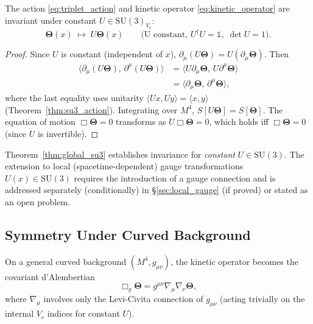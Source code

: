 \begin{theorem}
  \label{thm:global_su3}
  The action \eqref{eq:triplet_action} and kinetic operator
  \eqref{eq:kinetic_operator} are invariant under constant
  $U\in\mathrm{SU}(3)_{V_c}$:
  \begin{equation}
    \boldsymbol{\Theta}(x) \;\mapsto\; U\boldsymbol{\Theta}(x)
    \qquad\text{(U constant, } U^\dagger U = \mathbb{1},\; \det U = 1).
  \end{equation}
\end{theorem}

\begin{proof}
  Since $U$ is constant (independent of $x$), $\partial_\mu(U\boldsymbol{\Theta})
  = U(\partial_\mu\boldsymbol{\Theta})$.  Then
  \begin{align}
    \langle\partial_\mu(U\boldsymbol{\Theta}),\,\partial^\mu(U\boldsymbol{\Theta})\rangle
    &= \langle U\partial_\mu\boldsymbol{\Theta},\,U\partial^\mu\boldsymbol{\Theta}\rangle
    \nonumber\\
    &= \langle\partial_\mu\boldsymbol{\Theta},\,\partial^\mu\boldsymbol{\Theta}\rangle,
  \end{align}
  where the last equality uses unitarity $\langle Ux,Uy\rangle=\langle x,y\rangle$
  (Theorem~\ref{thm:su3_action}).  Integrating over $M^4$,
  $S[U\boldsymbol{\Theta}]=S[\boldsymbol{\Theta}]$.  The equation of motion
  $\Box\boldsymbol{\Theta}=0$ transforms as $U\Box\boldsymbol{\Theta}=0$, which
  holds iff $\Box\boldsymbol{\Theta}=0$ (since $U$ is invertible).
\end{proof}

\begin{remark}[Scope]
  Theorem~\ref{thm:global_su3} establishes invariance for \emph{constant}
  $U\in\mathrm{SU}(3)$.  The extension to local (spacetime-dependent) gauge
  transformations $U(x)\in\mathrm{SU}(3)$ requires the introduction of a
  gauge connection and is addressed separately (conditionally) in
  \S\ref{sec:local_gauge} (if proved) or stated as an open problem.
\end{remark}

\subsection{Symmetry Under Curved Background}

On a general curved background $(M^4,g_{\mu\nu})$, the kinetic operator
becomes the covariant d'Alembertian
\begin{equation}
  \Box_g\boldsymbol{\Theta} = g^{\mu\nu}\nabla_\mu\nabla_\nu\boldsymbol{\Theta},
\end{equation}
where $\nabla_\mu$ involves only the Levi-Civita connection of $g_{\mu\nu}$
(acting trivially on the internal $V_c$ indices for constant $U$).

